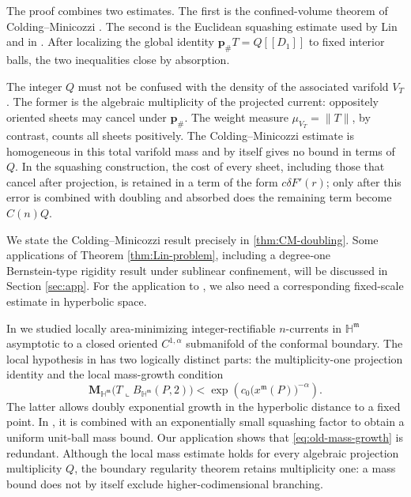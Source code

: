 \documentclass[11pt,reqno]{amsart}
\numberwithin{equation}{section}
\theoremstyle{definition}
\theoremstyle{remark}
\newcommand{\Hyp}{\mathbb H}
\newcommand{\Mass}{\mathbf M}
\newcommand{\restr}{\mathbin{\llcorner}}
\newcommand{\cur}[1]{\left[\!\left[#1\right]\!\right]}
\begin{document}
The proof combines two estimates.  The first is the confined-volume theorem of
Colding--Minicozzi 
\cite{ColdingMinicozzi}.  The second is the Euclidean squashing estimate used
by Lin and in \cite{JiangXie}.  After
localizing the global identity $\mathbf p_\#T=Q\cur{D_1}$ to fixed interior
balls, the two inequalities close by absorption. 

The integer $Q$ must not be confused with the density of the associated
varifold $V_T$.  The former is the algebraic multiplicity of the projected
current: oppositely oriented sheets may cancel under $\mathbf p_\#$.  The
weight measure $\mu_{V_T}=\|T\|$, by contrast, counts all sheets positively.
The Colding--Minicozzi estimate is homogeneous in this total varifold mass
and by itself gives no bound in terms of $Q$.  In the squashing construction,
the cost of every sheet, including those that cancel after projection, is
retained in a term of the form $c\delta F'(r)$; only after this error is
combined with doubling and absorbed does the remaining term become
$C(n)Q$.



We state the Colding--Minicozzi result precisely in
\cref{thm:CM-doubling}. Some  applications of Theorem \ref{thm:Lin-problem}, including a degree‑one Bernstein‑type rigidity result under sublinear confinement, will be discussed in Section \ref{sec:app}.  For the application to \cite{JiangXie}, we also need
a corresponding fixed-scale estimate in hyperbolic space. 


In \cite{JiangXie} we studied locally area-minimizing integer-rectifiable
$n$-currents in $\Hyp^{\mathfrak m}$ asymptotic to a closed oriented
$C^{1,\alpha}$ submanifold of the conformal boundary.  The local hypothesis
in \cite[Assumption~1.3]{JiangXie} has two logically distinct parts: the
multiplicity-one projection identity \cite[(1.9)]{JiangXie} and the local
mass-growth condition
\begin{equation}\label{eq:old-mass-growth}
 \Mass_{\Hyp^{\mathfrak m}}
 \bigl(T\restr B_{\Hyp^{\mathfrak m}}(P,2)\bigr)
 <\exp\!\left(c_0\bigl(x^{\mathfrak m}(P)\bigr)^{-\alpha}\right).
\end{equation}
The latter allows doubly exponential growth in the hyperbolic distance to a
fixed point.  In \cite[Section~3]{JiangXie}, it is combined with an
exponentially small squashing factor to obtain a uniform unit-ball mass
bound.  Our application shows that \eqref{eq:old-mass-growth} is
redundant.  Although the local mass estimate holds for every algebraic
projection multiplicity $Q$, the boundary regularity theorem retains
multiplicity one:
a mass bound does not by itself exclude higher-codimensional branching.
\end{document}
